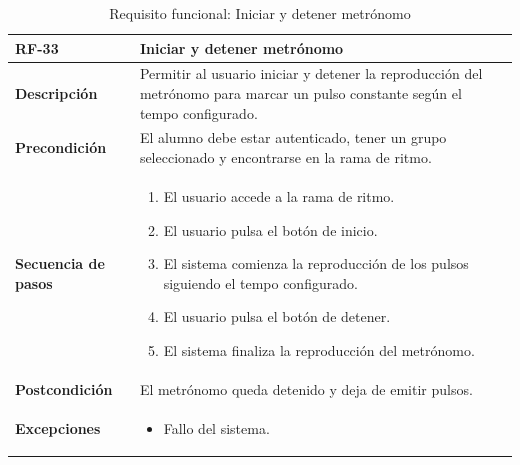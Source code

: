 \begin{table}[H]
\centering
\begin{tabularx}{\textwidth}{
|>{\centering\arraybackslash}l
|>{\centering\arraybackslash}X|}
\hline

\textbf{RF-33} & \textbf{Iniciar y detener metrónomo} \\ \hline

\textbf{Descripción} & Permitir al usuario iniciar y detener la reproducción del metrónomo para marcar un pulso constante según el tempo configurado. \\ \hline

\textbf{Precondición} & El alumno debe estar autenticado, tener un grupo seleccionado y encontrarse en la rama de ritmo. \\ \hline

\textbf{Secuencia de pasos} &
\begin{enumerate}
\item El usuario accede a la rama de ritmo.
\item El usuario pulsa el botón de inicio.
\item El sistema comienza la reproducción de los pulsos siguiendo el tempo configurado.
\item El usuario pulsa el botón de detener.
\item El sistema finaliza la reproducción del metrónomo.
\end{enumerate} \\ \hline

\textbf{Postcondición} & El metrónomo queda detenido y deja de emitir pulsos. \\ \hline

\textbf{Excepciones} &
\begin{itemize}
\item Fallo del sistema.
\end{itemize} \\ \hline

\end{tabularx}
\caption{Requisito funcional: Iniciar y detener metrónomo}
\end{table}
